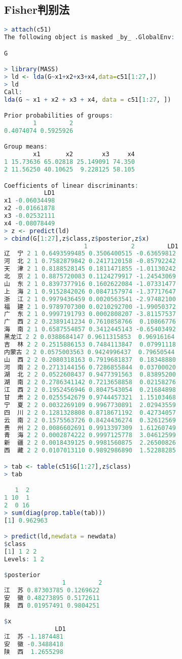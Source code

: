 \documentclass[11pt,a4paper,oneside]{book}
\begin{document}
\subsection{Fisher判别法}
\begin{lstlisting}[language=r]
> attach(c51)
The following object is masked _by_ .GlobalEnv:

G

> library(MASS)
> ld <- lda(G~x1+x2+x3+x4,data=c51[1:27,])
> ld
Call:
lda(G ~ x1 + x2 + x3 + x4, data = c51[1:27, ])

Prior probabilities of groups:
        1         2 
0.4074074 0.5925926 

Group means:
        x1       x2        x3     x4
1 15.73636 65.02818 25.149091 74.350
2 11.56250 40.10625  9.228125 58.105

Coefficients of linear discriminants:
           LD1
x1 -0.06034498
x2 -0.01661878
x3 -0.02532111
x4 -0.08078449
> z <- predict(ld)
> cbind(G[1:27],z$class,z$posterior,z$x)
                      1            2         LD1
辽  宁 2 1 0.6493599485 0.3506400515 -0.63659812
河  北 2 1 0.7582879842 0.2417120158 -0.85792242
天  津 2 1 0.8188528145 0.1811471855 -1.01130242
北  京 2 1 0.8875720083 0.1124279917 -1.24543069
山  东 2 1 0.8397377916 0.1602622084 -1.07331477
上  海 2 1 0.9152842026 0.0847157974 -1.37717647
浙  江 2 1 0.9979436459 0.0020563541 -2.97482100
福  建 2 1 0.9789707300 0.0210292700 -1.99050372
广  东 2 1 0.9997191793 0.0002808207 -3.81157537
广  西 2 2 0.2389141234 0.7610858766  0.10866776
海  南 2 1 0.6587554857 0.3412445143 -0.65403492
黑龙江 2 2 0.0388684147 0.9611315853  0.96916164
吉  林 2 2 0.2515886153 0.7484113847  0.07991118
内蒙古 2 2 0.0575003563 0.9424996437  0.79650544
山  西 2 2 0.2080318163 0.7919681837  0.18348880
河  南 2 2 0.2713144156 0.7286855844  0.03700020
湖  北 2 2 0.0522608437 0.9477391563  0.83895200
湖  南 2 2 0.2786341142 0.7213658858  0.02158276
江  西 2 2 0.1952456946 0.8047543054  0.21684898
甘  肃 2 2 0.0255542679 0.9744457321  1.15103468
宁  夏 2 2 0.0032269109 0.9967730891  2.02943559
四  川 2 2 0.1281328808 0.8718671192  0.42734057
云  南 2 2 0.1575563726 0.8424436274  0.32612569
贵  州 2 2 0.0086602691 0.9913397309  1.61260749
青  海 2 2 0.0002874222 0.9997125778  3.04612599
新  疆 2 2 0.0018439125 0.9981560875  2.26500826
西  藏 2 2 0.0107013110 0.9892986890  1.52288285

> tab <- table(c51$G[1:27],z$class)
> tab

   1  2
1 10  1
2  0 16
> sum(diag(prop.table(tab)))
[1] 0.962963

> predict(ld,newdata = newdata)
$class
[1] 1 2 2
Levels: 1 2

$posterior
                1         2
江  苏 0.87303785 0.1269622
安  徽 0.48273895 0.5172611
陕  西 0.01957491 0.9804251

$x
              LD1
江  苏 -1.1874481
安  徽 -0.3488418
陕  西  1.2655298
\end{lstlisting}
\end{document}
